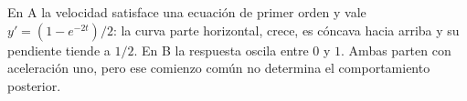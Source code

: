 En A la velocidad satisface una ecuación de primer orden y vale
\(y'=(1-e^{-2t})/2\): la curva parte horizontal, crece, es cóncava hacia arriba y su pendiente tiende a \(1/2\). En B la respuesta oscila entre \(0\) y \(1\). Ambas parten con aceleración uno, pero ese comienzo común no determina el comportamiento posterior.
